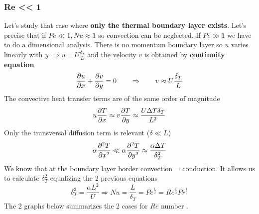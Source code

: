 	\subsubsection{Re << 1}
		Let's study that case where \textbf{only the thermal boundary layer exists}. Let's precise that if $Pe \ll 1, Nu \approx 1$ so convection can be neglected. If $Pe \gg 1$ we have to do a dimensional analysis. There is no momentum boundary layer so $u$ varies linearly with $y$ $\Rightarrow u = U\frac{\delta _T}{L}$ and the velocity $v$ is obtained by \textbf{continuity equation}
		\begin{equation}
			\frac{\D u}{\D x} + \frac{\D v}{\D y} = 0 \qquad \Rightarrow \qquad v \approx U\frac{\delta _T}{L}
		\end{equation}
		The convective heat transfer terms are of the same order of magnitude 
		\begin{equation}
			u\frac{\D T}{\D x} \approx v\frac{\D T}{\D y} \approx \frac{U\Delta T \delta _T}{L^2}
		\end{equation}
		Only the transversal diffusion term is relevant ($\delta \ll L$)
		\begin{equation}
			\alpha \frac{\D ^2 T}{\D x^2} \ll \alpha \frac{\D ^2 T}{\D y^2} \approx \frac{\alpha \Delta T}{\delta _T ^2}
		\end{equation}
		We know that at the boundary layer border convection = conduction. It allows us to calculate $\delta _T^2$ equalizing the 2 previous equations
		\begin{equation}
			\delta _T^3 =  \frac{\alpha L^2}{U} \Rightarrow Nu = \frac{L}{\delta _T} = Pe^{\frac{1}{3}} = Re^{\frac{1}{3}} Pr^{\frac{1}{3}}
		\end{equation}
		The 2 graphs below summarizes the 2 cases for $Re$ number	.	\\
		
